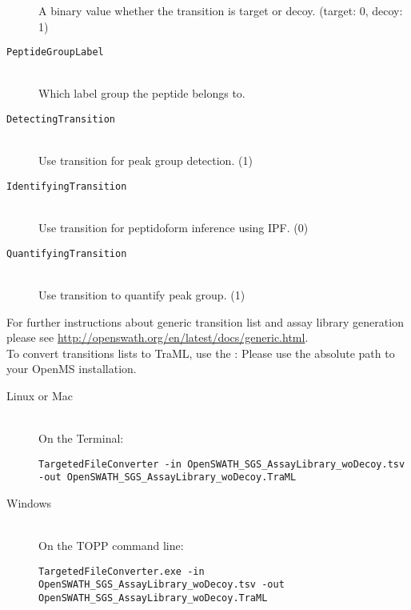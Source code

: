 \begin{description}
  A binary value whether the transition is target or decoy. (target: 0, decoy: 1)
  \item[\texttt{PeptideGroupLabel}] \hfill \\
  Which label group the peptide belongs to. \\
  \item[\texttt{DetectingTransition}] \hfill \\
  Use transition for peak group detection. (1)\\
  \item[\texttt{IdentifyingTransition}] \hfill \\
  Use transition for peptidoform inference using IPF. (0)\\
  \item[\texttt{QuantifyingTransition}] \hfill \\
  Use transition to quantify peak group. (1)\\
\end{description}

\noindent For further instructions about generic transition list and assay library generation please see \url{http://openswath.org/en/latest/docs/generic.html}. \\

\noindent To convert transitions lists to TraML, use the : Please use the absolute path to your OpenMS installation. \\

\begin{description}
  \item[Linux or Mac] \hfill \\
    On the Terminal:
    \begin{code}
	\begin{verbatim}
TargetedFileConverter -in OpenSWATH_SGS_AssayLibrary_woDecoy.tsv -out OpenSWATH_SGS_AssayLibrary_woDecoy.TraML
    \end{verbatim}
	\end{code}
  \item[Windows] \hfill \\
    On the TOPP command line:
    \begin{code}
	\begin{verbatim}
TargetedFileConverter.exe -in OpenSWATH_SGS_AssayLibrary_woDecoy.tsv -out OpenSWATH_SGS_AssayLibrary_woDecoy.TraML
    \end{verbatim}
	\end{code}
\end{description}

